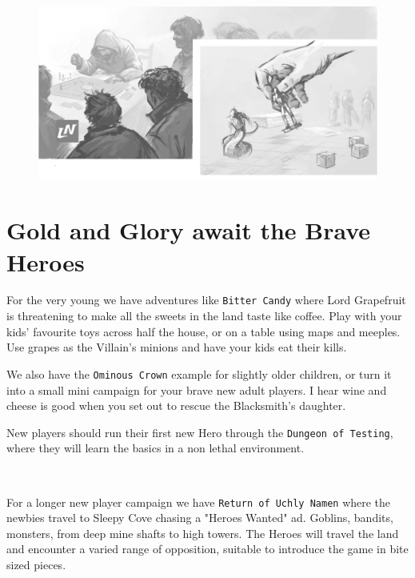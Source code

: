 \begin{figure}[b]
\centering
\includegraphics[width=0.999\textwidth]{./fig/tabletop.jpg}
\end{figure}








\clearpage %

\section*{Gold and Glory await the Brave Heroes}

\noindent
For the very young we have adventures like \texttt{Bitter Candy} where Lord Grapefruit is threatening to make all the sweets in the land taste like coffee. Play with your kids' favourite toys across half the house, or on a table using maps and meeples. Use grapes as the Villain's minions and have your kids eat their kills.

We also have the \texttt{Ominous Crown} example for slightly older children, or turn it into a small mini campaign for your brave new adult players. I hear wine and cheese is good when you set out to rescue the Blacksmith's daughter.

New players should run their first new Hero through the \texttt{Dungeon of Testing}, where they will learn the basics in a non lethal environment.

\

\noindent
For a longer new player campaign we have \texttt{Return of Uchly Namen} where the newbies travel to Sleepy Cove chasing a "Heroes Wanted" ad. Goblins, bandits, monsters, from deep mine shafts to high towers. The Heroes will travel the land and encounter a varied range of opposition, suitable to introduce the game in bite sized pieces.

